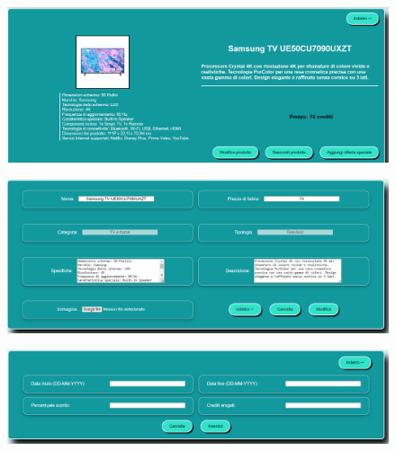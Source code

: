 \documentclass[a4paper, 14pt]{article}
\begin{document}
\begin{flushleft}
\begin{itemize}
					\end{itemize}
				\begin{figure}[H]
					\centering
					\includegraphics[width=\textwidth, frame=2pt]{"screenProdottoGestore.png"}	
				\end{figure}
				\begin{figure}[H]
					\centering
					\includegraphics[width=\textwidth, frame=2pt]{"screenModificaProdotto.png"}	
				\end{figure}
				\begin{figure}[H]
					\centering
					\includegraphics[width=\textwidth, frame=2pt]{"screenInserimentoOffertaSpeciale.png"}	
				\end{figure}
			

\end{flushleft}
\end{document}
